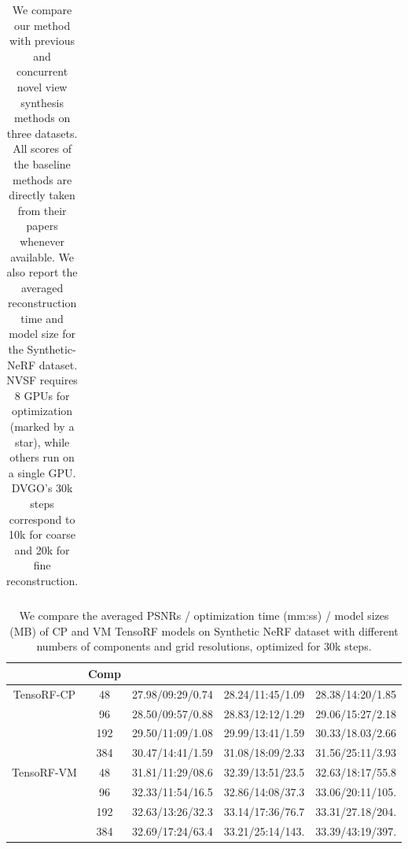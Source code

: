\documentclass[runningheads]{llncs}
\begin{document}
\begin{table}[t]
{\begin{tabular}{l|cc|cc|cc|cc|cc}
\end{tabular}
} 
\vspace{1mm}
\caption{We compare our method with previous and concurrent novel view synthesis methods on three datasets. All scores of the baseline methods are directly taken from their papers whenever available. We also report the averaged reconstruction time and model size for the Synthetic-NeRF dataset. NVSF requires 8 GPUs for optimization (marked by a star), while others run on a single GPU. DVGO's 30k steps correspond to 10k for coarse and 20k for fine reconstruction.} \vspace{-6mm}

\label{table:results}  
\end{table}
\setlength{\tabcolsep}{1.4pt}


\begin{table*}[tpb]
    \centering
\centering
        \renewcommand\tabcolsep{5.0pt}
        \begin{tabular}{c|c|c|c|c}
        \hline
        &Comp                        &                &                &      \\
        \hline\hline
    \multirow{4}{*}{TensoRF-CP} &48   & 27.98/09:29/0.74      &  28.24/11:45/1.09     &  28.38/14:20/1.85 \\
                                &96   & 28.50/09:57/0.88      &  28.83/12:12/1.29     &  29.06/15:27/2.18 \\
                                &192  & 29.50/11:09/1.08      &  29.99/13:41/1.59     &  30.33/18.03/2.66 \\
                                &384  & 30.47/14:41/1.59      &  31.08/18:09/2.33     &  31.56/25:11/3.93 \\

        \hline
    \multirow{4}{*}{TensoRF-VM} &48   & 31.81/11:29/08.6 &     32.39/13:51/23.5 &   32.63/18:17/55.8  \\
                                &96   & 32.33/11:54/16.5 &     32.86/14:08/37.3 &   33.06/20:11/105. \\
                                &192  & 32.63/13:26/32.3 &     33.14/17:36/76.7 &   33.31/27.18/204. \\
                                &384  & 32.69/17:24/63.4 &     33.21/25:14/143. &   33.39/43:19/397.\\
        \hline
        \end{tabular}
    \caption{
    We compare the averaged PSNRs / optimization time (mm:ss) / model sizes (MB) of CP and VM TensoRF models on Synthetic NeRF dataset \cite{mildenhall2020nerf} with different numbers of components and grid resolutions, optimized for 30k steps.
}\vspace{-6mm}
    \label{tab:decomp}
\end{table*}
\end{document}
